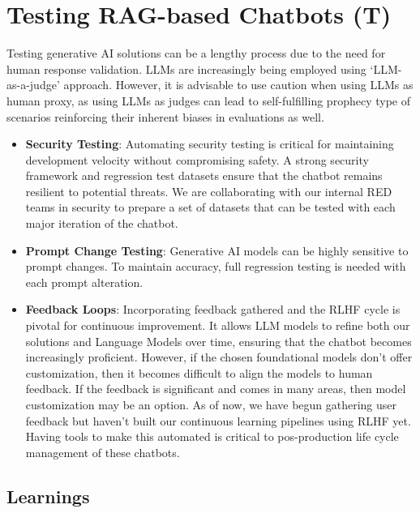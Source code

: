 \documentclass[sigconf]{acmart}
\begin{document}
\vspace{-3mm}
\section{Testing RAG-based Chatbots (T)}
Testing generative AI solutions can be a lengthy process due to the need for human response validation. LLMs are increasingly being employed using ‘LLM-as-a-judge’ approach. However, it is advisable to use caution when using LLMs as human proxy, as using LLMs as judges can lead to self-fulfilling prophecy type of scenarios reinforcing their inherent biases in evaluations as well. 
\begin{itemize}
\item{\textbf{Security Testing}}: Automating security testing is critical for maintaining development velocity without compromising safety. A strong security framework and regression test datasets ensure that the chatbot remains resilient to potential threats. We are collaborating with our internal RED teams in security to prepare a set of datasets that can be tested with each major iteration of the chatbot.

\item{\textbf{Prompt Change Testing}}: Generative AI models can be highly sensitive to prompt changes. To maintain accuracy, full regression testing is needed with each prompt alteration. %

\item{\textbf{Feedback Loops}}: Incorporating feedback gathered and the RLHF cycle is pivotal for continuous improvement. It allows LLM models to refine both our solutions and Language Models over time, ensuring that the chatbot becomes increasingly proficient. However, if the chosen foundational models don’t offer customization, then it becomes difficult to align the models to human feedback. If the feedback is significant and comes in many areas, then model customization may be an option. As of now, we have begun gathering user feedback but haven’t built our continuous learning pipelines using RLHF yet. Having tools to make this automated is critical to pos-production life cycle management of these chatbots.

\end{itemize}

\vspace{-1mm}
\subsection{Learnings}
\end{document}
